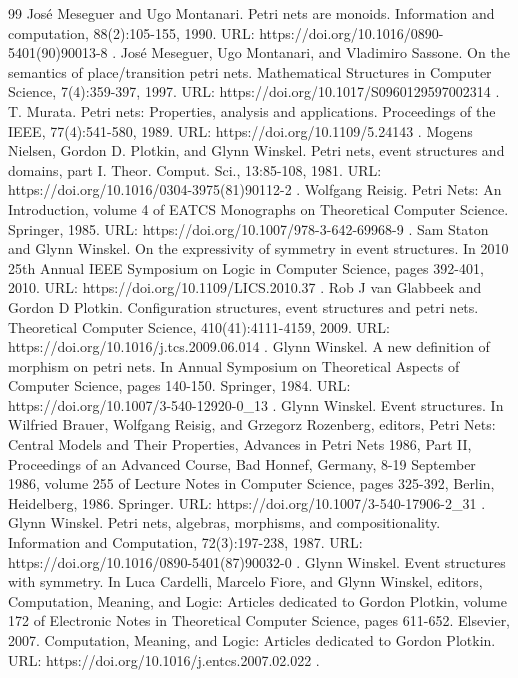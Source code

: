 \begin{thebibliography}{99}
 José Meseguer and Ugo Montanari. Petri nets are monoids. Information and computation, 88(2):105-155, 1990. URL: https://doi.org/10.1016/0890-5401(90)90013-8 .
 José Meseguer, Ugo Montanari, and Vladimiro Sassone. On the semantics of place/transition petri nets. Mathematical Structures in Computer Science, 7(4):359-397, 1997. URL: https://doi.org/10.1017/S0960129597002314 .
 T. Murata. Petri nets: Properties, analysis and applications. Proceedings of the IEEE, 77(4):541-580, 1989. URL: https://doi.org/10.1109/5.24143 .
 Mogens Nielsen, Gordon D. Plotkin, and Glynn Winskel. Petri nets, event structures and domains, part I. Theor. Comput. Sci., 13:85-108, 1981. URL: https://doi.org/10.1016/0304-3975(81)90112-2 .
 Wolfgang Reisig. Petri Nets: An Introduction, volume 4 of EATCS Monographs on Theoretical Computer Science. Springer, 1985. URL: https://doi.org/10.1007/978-3-642-69968-9 .
 Sam Staton and Glynn Winskel. On the expressivity of symmetry in event structures. In 2010 25th Annual IEEE Symposium on Logic in Computer Science, pages 392-401, 2010. URL: https://doi.org/10.1109/LICS.2010.37 .
 Rob J van Glabbeek and Gordon D Plotkin. Configuration structures, event structures and petri nets. Theoretical Computer Science, 410(41):4111-4159, 2009. URL: https://doi.org/10.1016/j.tcs.2009.06.014 .
 Glynn Winskel. A new definition of morphism on petri nets. In Annual Symposium on Theoretical Aspects of Computer Science, pages 140-150. Springer, 1984. URL: https://doi.org/10.1007/3-540-12920-0\_13 .
 Glynn Winskel. Event structures. In Wilfried Brauer, Wolfgang Reisig, and Grzegorz Rozenberg, editors, Petri Nets: Central Models and Their Properties, Advances in Petri Nets 1986, Part II, Proceedings of an Advanced Course, Bad Honnef, Germany, 8-19 September 1986, volume 255 of Lecture Notes in Computer Science, pages 325-392, Berlin, Heidelberg, 1986. Springer. URL: https://doi.org/10.1007/3-540-17906-2\_31 .
 Glynn Winskel. Petri nets, algebras, morphisms, and compositionality. Information and Computation, 72(3):197-238, 1987. URL: https://doi.org/10.1016/0890-5401(87)90032-0 .
 Glynn Winskel. Event structures with symmetry. In Luca Cardelli, Marcelo Fiore, and Glynn Winskel, editors, Computation, Meaning, and Logic: Articles dedicated to Gordon Plotkin, volume 172 of Electronic Notes in Theoretical Computer Science, pages 611-652. Elsevier, 2007. Computation, Meaning, and Logic: Articles dedicated to Gordon Plotkin. URL: https://doi.org/10.1016/j.entcs.2007.02.022 .
\end{thebibliography}
